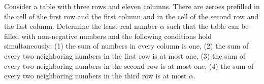 Consider a table with three rows and eleven columns. There are zeroes prefilled in the cell of the first row and the first column and in the cell of the second row and the last column. Determine the least real number $\alpha$ such that the table can be filled with non-negative numbers and the following conditions hold simultaneously:
(1) the sum of numbers in every column is one,
(2) the sum of every two neighboring numbers in the first row is at most one,
(3) the sum of every two neighboring numbers in the second row is at most one,
(4) the sum of every two neighboring numbers in the third row is at most $\alpha$.
